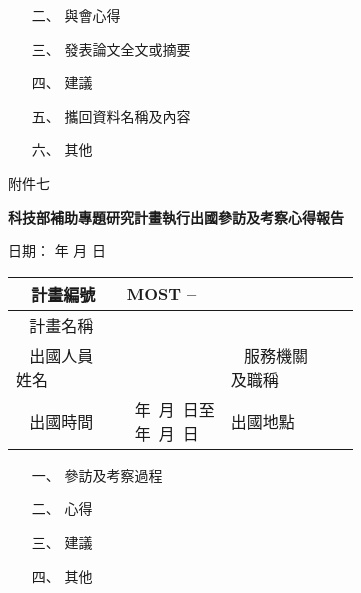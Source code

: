 \documentclass[12pt]{article}
\begin{document}
\begin{CJK}{UTF8}{}
\begin{enumerate}
\item[二、] 與會心得

\item[三、] 發表論文全文或摘要

\item[四、] 建議

\item[五、] 攜回資料名稱及內容

\item[六、] 其他

\end{enumerate}

\newpage
\vspace*{-1cm}
\noindent 附件七
\begin{center}
{\bf \Large 科技部補助專題研究計畫執行出國參訪及考察心得報告}
\end{center}

\hfill{\small 日期：   年   月   日 }
\begin{table}[h!]{\renewcommand{\arraystretch}{2}
    \begin{tabular}{|l|l|l|l|}
    \hline
   ~ 計畫編號 ~ & \multicolumn{3}{l|}{MOST  --} \\ \hline
   ~ 計畫名稱 ~ & \multicolumn{3}{l|}{} \\ \hline
    \makecell{~ 出國人員 ~\\ 姓名} & ~ \hspace*{5cm} & \makecell{~ 服務機關 ~\\及職稱} & ~ \hspace*{5cm} \\ \hline    
   ~ 出國時間 ~ & \makecell{~年~月~日至\\  ~年~月~日} & 出國地點 & ~ \\ \hline
  
    \end{tabular}
}
\end{table}
\begin{enumerate}
\item[一、] 參訪及考察過程

\item[二、] 心得

\item[三、] 建議

\item[四、]  其他

\end{enumerate}







\end{CJK}
\end{document}
